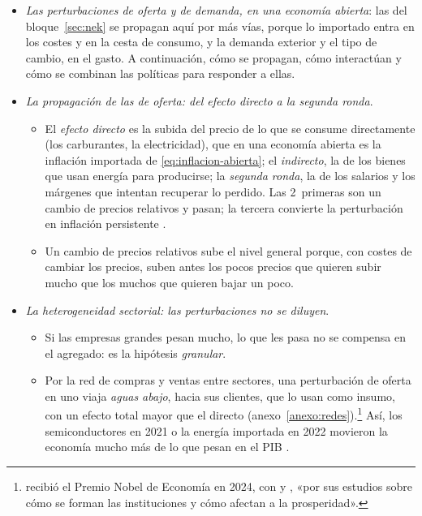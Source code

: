\documentclass[11pt]{article}
\begin{document}
\begin{itemize}
\item \emph{Las perturbaciones de oferta y de demanda, en una economía abierta}: las del bloque~\ref{sec:nek} se propagan aquí por más vías, porque lo importado entra en los costes y en la cesta de consumo, y la demanda exterior y el tipo de cambio, en el gasto. A continuación, cómo se propagan, cómo interactúan y cómo se combinan las políticas para responder a ellas.
\item \emph{La propagación de las de oferta: del efecto directo a la segunda ronda}.
  \begin{itemize}
  \item El \emph{efecto directo} es la subida del precio de lo que se consume directamente (los carburantes, la electricidad), que en una economía abierta es la inflación importada de \eqref{eq:inflacion-abierta}; el \emph{indirecto}, la de los bienes que usan energía para producirse; la \emph{segunda ronda}, la de los salarios y los márgenes que intentan recuperar lo perdido. Las 2~primeras son un cambio de precios relativos y pasan; la tercera convierte la perturbación en inflación persistente .
  \item Un cambio de precios relativos sube el nivel general porque, con costes de cambiar los precios, suben antes los pocos precios que quieren subir mucho que los muchos que quieren bajar un poco\nocite{BallMankiw1995Relative}.
  \end{itemize}
\item \emph{La heterogeneidad sectorial: las perturbaciones no se diluyen}.
  \begin{itemize}
  \item Si las empresas grandes pesan mucho, lo que les pasa no se compensa en el agregado: es la hipótesis \emph{granular}\nocite{Gabaix2011Granular}.
  \item Por la red de compras y ventas entre sectores, una perturbación de oferta en uno viaja \emph{aguas abajo}, hacia sus clientes, que lo usan como insumo, con un efecto total mayor que el directo\nocite{AcemogluAkcigitKerr2016} (anexo~\ref{anexo:redes}).\footnote{ recibió el Premio Nobel de Economía en 2024, con  y , «por sus estudios sobre cómo se forman las instituciones y cómo afectan a la prosperidad»\nocite{NobelPrize2024}.} Así, los semiconductores en 2021 o la energía importada en 2022 movieron la economía mucho más de lo que pesan en el PIB .
  \end{itemize}

\end{itemize}
\end{document}
